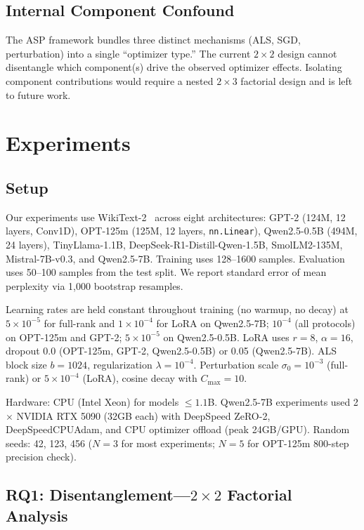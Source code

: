 \documentclass[11pt]{article}
\begin{document}
\subsection{Internal Component Confound}

The ASP framework bundles three distinct mechanisms (ALS, SGD, perturbation) into a single ``optimizer type.'' The current $2\times2$ design cannot disentangle which component(s) drive the observed optimizer effects. Isolating component contributions would require a nested $2\times3$ factorial design and is left to future work.

\section{Experiments}

\subsection{Setup}

Our experiments use WikiText-2~\cite{merity2017pointer} across eight architectures: GPT-2 (124M, 12 layers, Conv1D), OPT-125m (125M, 12 layers, \texttt{nn.Linear}), Qwen2.5-0.5B (494M, 24 layers), TinyLlama-1.1B, DeepSeek-R1-Distill-Qwen-1.5B, SmolLM2-135M, Mistral-7B-v0.3, and Qwen2.5-7B. Training uses 128--1600 samples. Evaluation uses 50--100 samples from the test split. We report standard error of mean perplexity via 1,000 bootstrap resamples.

Learning rates are held constant throughout training (no warmup, no decay) at $5 \times 10^{-5}$ for full-rank and $1 \times 10^{-4}$ for LoRA on Qwen2.5-7B; $10^{-4}$ (all protocols) on OPT-125m and GPT-2; $5 \times 10^{-5}$ on Qwen2.5-0.5B. LoRA uses $r=8$, $\alpha=16$, dropout 0.0 (OPT-125m, GPT-2, Qwen2.5-0.5B) or 0.05 (Qwen2.5-7B). ALS block size $b=1024$, regularization $\lambda=10^{-4}$. Perturbation scale $\sigma_0=10^{-3}$ (full-rank) or $5 \times 10^{-4}$ (LoRA), cosine decay with $C_{\max}=10$.

Hardware: CPU (Intel Xeon) for models $\leq 1.1$B. Qwen2.5-7B experiments used 2$\times$ NVIDIA RTX 5090 (32GB each) with DeepSpeed ZeRO-2, DeepSpeedCPUAdam, and CPU optimizer offload (peak 24GB/GPU). Random seeds: 42, 123, 456 ($N=3$ for most experiments; $N=5$ for OPT-125m 800-step precision check).

\subsection{RQ1: Disentanglement---$2\times2$ Factorial Analysis}
\end{document}
